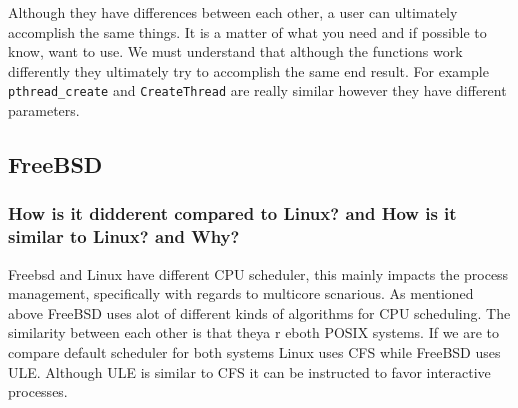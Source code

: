 \documentclass[letterpaper,10pt,draftclsnofoot,onecolumn]{IEEEtran}
\begin{document}
Although they have differences between each other, a user can ultimately accomplish the same things. It is a matter of what you need and if possible to know, want to use. We must understand that although the functions work differently they ultimately try to accomplish the same end result. For example \verb|pthread_create| and \verb|CreateThread| are really similar however they have different parameters.

\subsection*{FreeBSD}
\subsubsection*{How is it didderent compared to Linux? and How is it similar to Linux? and Why?}

Freebsd and Linux have different CPU scheduler, this mainly impacts the process management, specifically with regards to multicore scnarious. As mentioned above FreeBSD uses alot of different kinds of algorithms for CPU scheduling. The similarity between each other is that theya r eboth POSIX systems. If we are to compare default scheduler for both systems Linux uses CFS while FreeBSD uses ULE. Although ULE is similar to CFS it can be instructed to favor interactive processes.


\end{document}
